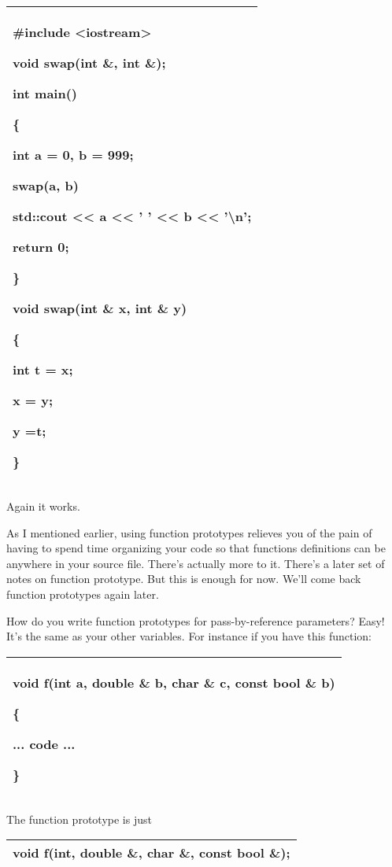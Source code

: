 \documentclass[
]{article}
\begin{document}
\begin{longtable}[]{@{}l@{}}
\toprule
\endhead
\begin{minipage}[t]{0.97\columnwidth}\raggedright
\#include \textless iostream\textgreater{}

void swap(int \&, int \&);

int main()

\{

int a = 0, b = 999;

swap(a, b)

std::cout \textless\textless{} a \textless\textless{} ' '
\textless\textless{} b \textless\textless{} '\textbackslash n';

return 0;

\}

void swap(int \& x, int \& y)

\{

int t = x;

x = y;

y =t;

\}\strut
\end{minipage}\tabularnewline
\bottomrule
\end{longtable}

Again it works.

As I mentioned earlier, using function prototypes relieves you of the
pain of having to spend time organizing your code so that functions
definitions can be anywhere in your source file. There's actually more
to it. There's a later set of notes on function prototype. But this is
enough for now. We'll come back function prototypes again later.

How do you write function prototypes for pass-by-reference parameters?
Easy! It's the same as your other variables. For instance if you have
this function:

\begin{longtable}[]{@{}l@{}}
\toprule
\endhead
\begin{minipage}[t]{0.97\columnwidth}\raggedright
void f(int a, double \& b, char \& c, const bool \& b)

\{

... code ...

\}\strut
\end{minipage}\tabularnewline
\bottomrule
\end{longtable}

The function prototype is just

\begin{longtable}[]{@{}l@{}}
\toprule
\endhead
void f(int, double \&, char \&, const bool \&);\tabularnewline
\bottomrule
\end{longtable}
\end{document}
